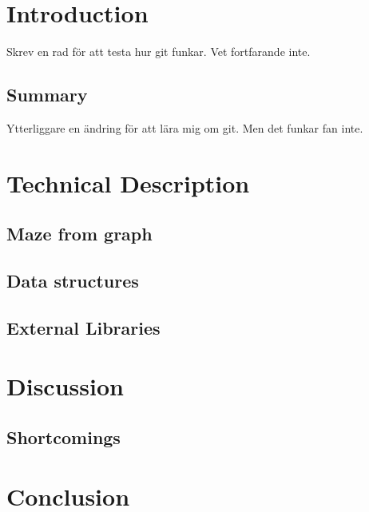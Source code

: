 \documentclass[12pt, a4paper]{article}
\begin{document}
\maketitle

\newpage


\tableofcontents


\newpage
\section{Introduction}
Skrev en rad för att testa hur git funkar. Vet fortfarande inte.
\subsection{Summary}
Ytterliggare en ändring för att lära mig om git. Men det funkar fan inte.
\newpage
\section{Technical Description}
\subsection{Maze from graph}
\subsection{Data structures}



\subsection{External Libraries}



\newpage
\section{Discussion}
\subsection{Shortcomings}



\newpage
\section{Conclusion}
\end{document}
